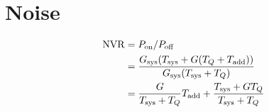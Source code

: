\documentclass{article}
\begin{document}




\section{Noise}

\begin{equation*}
\begin{aligned}
\mathrm{NVR} &= P_{\mathrm{on}}/P_{\mathrm{off}}\\
&= \frac{G_{\mathrm{sys}}(T_{\mathrm{sys}}+G(T_Q+T_{\mathrm{add}}))}{G_{\mathrm{sys}}(T_{\mathrm{sys}}+T_Q)}\\
&= \frac{G}{T_{\mathrm{sys}}+T_Q}T_\mathrm{add} + \frac{T_{\mathrm{sys}}+G T_Q}{T_{\mathrm{sys}}+T_Q}
\end{aligned}
\end{equation*}
\end{document}

